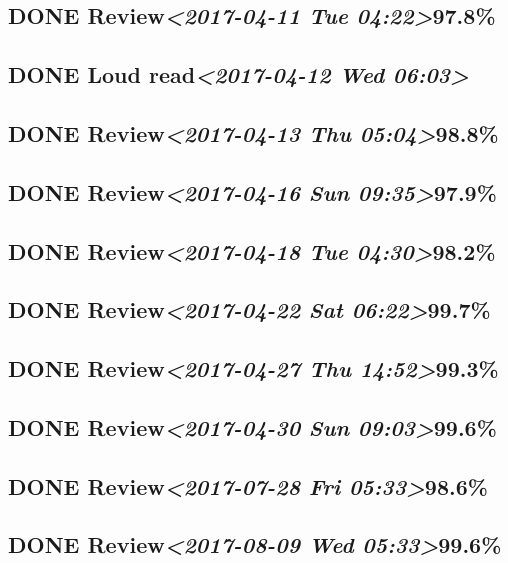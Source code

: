 \documentclass[11pt]{ctexart}
\begin{document}
\subsection{{\bfseries\sffamily DONE} Review\textit{<2017-04-11 Tue 04:22>}97.8\%}
\label{sec:org3650124}

\subsection{{\bfseries\sffamily DONE} Loud read\textit{<2017-04-12 Wed 06:03>}}
\label{sec:orgad7c27c}
\subsection{{\bfseries\sffamily DONE} Review\textit{<2017-04-13 Thu 05:04>}98.8\%}
\label{sec:org488a7f0}
\subsection{{\bfseries\sffamily DONE} Review\textit{<2017-04-16 Sun 09:35>}97.9\%}
\label{sec:org49d86dc}
\subsection{{\bfseries\sffamily DONE} Review\textit{<2017-04-18 Tue 04:30>}98.2\%}
\label{sec:org9188d22}
\subsection{{\bfseries\sffamily DONE} Review\textit{<2017-04-22 Sat 06:22>}99.7\%}
\label{sec:org34bca22}
\subsection{{\bfseries\sffamily DONE} Review\textit{<2017-04-27 Thu 14:52>}99.3\%}
\label{sec:org3b31f94}
\subsection{{\bfseries\sffamily DONE} Review\textit{<2017-04-30 Sun 09:03>}99.6\%}
\label{sec:orgbf1d54e}
\subsection{{\bfseries\sffamily DONE} Review\textit{<2017-07-28 Fri 05:33>}98.6\%}
\label{sec:orgb0363e6}
\subsection{{\bfseries\sffamily DONE} Review\textit{<2017-08-09 Wed 05:33>}99.6\%}
\label{sec:org1f243ac}
\end{document}
